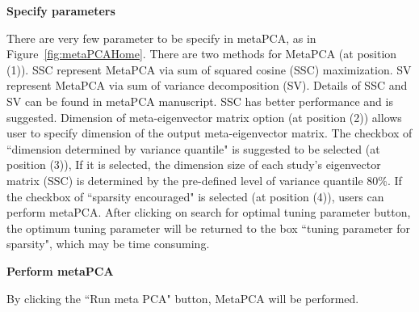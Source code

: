 \begin{steps}

\item \textbf{Specify parameters} 

There are very few parameter to be specify in metaPCA, as in Figure~\ref{fig:metaPCAHome}.
There are two methods for MetaPCA (at position {\color{red} (1)}). 
SSC represent MetaPCA via sum of squared cosine (SSC) maximization.
SV represent MetaPCA via sum of variance decomposition (SV).
Details of SSC and SV can be found in metaPCA manuscript.
SSC has better performance and is suggested.
Dimension of meta-eigenvector matrix option (at position {\color{red} (2)}) allows user to specify dimension of the output meta-eigenvector matrix.
The checkbox of ``dimension determined by variance quantile" is suggested to be selected (at position {\color{red} (3)}),
If it is selected, the dimension size of each study's eigenvector matrix (SSC) is determined  by the pre-defined level of variance quantile 80\%.
If the checkbox of ``sparsity encouraged" is selected (at position {\color{red} (4)}), users can perform metaPCA.
After clicking on search for optimal tuning parameter button, the optimum tuning parameter will be returned to the box ``tuning parameter for sparsity", 
which may be time consuming.

\item \textbf{Perform metaPCA} 

By clicking the ``Run meta PCA" button, MetaPCA will be performed.


\end{steps}

